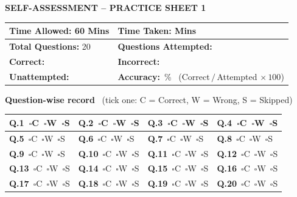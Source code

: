 \documentclass[11pt,a4paper]{article}
\begin{document}
\clearpage
\begin{center}{\Large\bfseries SELF-ASSESSMENT -- PRACTICE SHEET 1}\end{center}
\medskip
\renewcommand{\arraystretch}{1.9}
\noindent\begin{tabularx}{\linewidth}{|X|X|}\hline
\textbf{Time Allowed:} 60 Mins & \textbf{Time Taken:} \underline{\hspace{2.4cm}} Mins\\ \hline
\textbf{Total Questions:} 20 & \textbf{Questions Attempted:} \underline{\hspace{2cm}}\\ \hline
\textbf{Correct:} \underline{\hspace{2.6cm}} & \textbf{Incorrect:} \underline{\hspace{2.6cm}}\\ \hline
\textbf{Unattempted:} \underline{\hspace{2.2cm}} & \textbf{Accuracy:} \underline{\hspace{1.6cm}}\,\% \ {\footnotesize(Correct$\,/\,$Attempted$\,\times100$)}\\ \hline
\end{tabularx}
\renewcommand{\arraystretch}{1.0}
\bigskip
\textbf{Question-wise record} \ {\small(tick one: C = Correct, W = Wrong, S = Skipped)}\par\smallskip
{\small\renewcommand{\arraystretch}{1.55}
\noindent\begin{tabularx}{\linewidth}{|*{4}{>{\centering\arraybackslash}X|}}\hline
\textbf{Q.1}\ $\square$C\ $\square$W\ $\square$S & \textbf{Q.2}\ $\square$C\ $\square$W\ $\square$S & \textbf{Q.3}\ $\square$C\ $\square$W\ $\square$S & \textbf{Q.4}\ $\square$C\ $\square$W\ $\square$S \\ \hline
\textbf{Q.5}\ $\square$C\ $\square$W\ $\square$S & \textbf{Q.6}\ $\square$C\ $\square$W\ $\square$S & \textbf{Q.7}\ $\square$C\ $\square$W\ $\square$S & \textbf{Q.8}\ $\square$C\ $\square$W\ $\square$S \\ \hline
\textbf{Q.9}\ $\square$C\ $\square$W\ $\square$S & \textbf{Q.10}\ $\square$C\ $\square$W\ $\square$S & \textbf{Q.11}\ $\square$C\ $\square$W\ $\square$S & \textbf{Q.12}\ $\square$C\ $\square$W\ $\square$S \\ \hline
\textbf{Q.13}\ $\square$C\ $\square$W\ $\square$S & \textbf{Q.14}\ $\square$C\ $\square$W\ $\square$S & \textbf{Q.15}\ $\square$C\ $\square$W\ $\square$S & \textbf{Q.16}\ $\square$C\ $\square$W\ $\square$S \\ \hline
\textbf{Q.17}\ $\square$C\ $\square$W\ $\square$S & \textbf{Q.18}\ $\square$C\ $\square$W\ $\square$S & \textbf{Q.19}\ $\square$C\ $\square$W\ $\square$S & \textbf{Q.20}\ $\square$C\ $\square$W\ $\square$S \\ \hline
\end{tabularx}}
\end{document}
